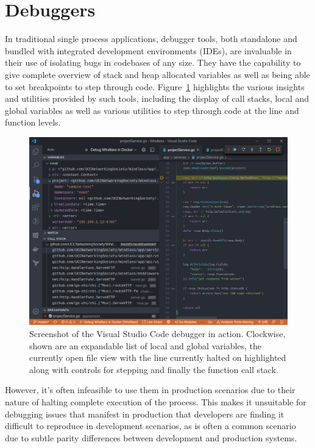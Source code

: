 \documentclass[12pt,pdftex,titlepage]{report}
\begin{document}
        \section{Debuggers}
            In traditional single process applications, debugger tools, both standalone and bundled with integrated development environments (IDEs), are invaluable in their
            use of isolating bugs in codebases of any size. They have the capability to give complete overview of stack and heap allocated variables as well as being able to set
            breakpoints to step through code. Figure~\ref{fig:debugger} highlights the various insights and utilities provided by such tools, including the display of call stacks,
            local and global variables as well as various utilities to step through code at the line and function levels.

            \begin{figure}[hbt!]
                \centering
                \includegraphics[scale=0.335]{debugger}
                \caption{Screenshot of the Visual Studio Code debugger in action. Clockwise, shown are an expandable list of local and global variables, the currently open file view
                with the line currently halted on highlighted along with controls for stepping and finally the function call stack.}
                \label{fig:debugger}
            \end{figure}
            
            However, it's often infeasible to use them in production scenarios due to their nature of halting complete execution of the process.
            This makes it unsuitable for debugging issues that manifest in production that developers are finding it difficult to reproduce in development scenarios, as is often
            a common scenario due to subtle parity differences between development and production systems.
\end{document}
